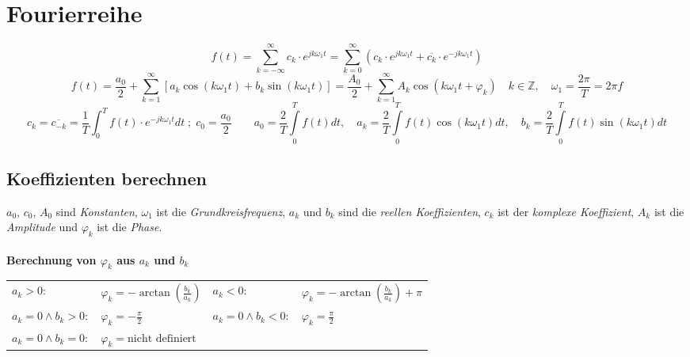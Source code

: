 \section{Fourierreihe}
  	$$\boxed{f(t) = \sum\limits_{k = -\infty}^{\infty} c_k \cdot e^{j k \omega_1
  	t}}= \boxed{\sum\limits_{k = 0}^{\infty} \left(c_k \cdot e^{j k \omega_1
  	t} + \overline{c_k} \cdot e^{-j k \omega_1t}\right)}$$
  	$$\boxed{f(t) = \frac{a_0}{2} + \sum\limits_{k=1}^{\infty} \left[a_k \cos(k
  	\omega_1 t) + b_k \sin(k \omega_1 t)\right]}=\boxed{\frac{A_0}{2} +
  	\sum\limits_{k=1}^{\infty} A_k \cos(k \omega_1 t + \varphi_k)} \quad k\in
  	\mathbb{Z}, \quad \boxed{\omega_1=\frac{2 \pi}{T}=2 \pi f}$$	
	$$\boxed{c_k=\overline{c_{-k}}=\frac{1}{T}\int_0^T{f(t)\cdot
	e^{-jk\omega_1
	t}dt} \; ; \; c_0 = \frac{a_0}{2}} \qquad \boxed{a_0 = \frac{2}{T}\int\limits_0^{T}
	f(t)dt, \quad a_k = \frac{2}{T}\int\limits_0^{T} f(t)\cos(k \omega_1 t) dt, \quad b_k =
	\frac{2}{T}\int\limits_0^{T} f(t)\sin(k \omega_1 t) dt}$$

	\subsection{Koeffizienten berechnen}
		$a_0$, $c_0$, $A_0$ sind \textit{Konstanten}, $\omega_1$ ist die
		\textit{Grundkreisfrequenz}, $a_k$ und $b_k$ sind die \textit{reellen
		Koeffizienten}, $c_k$ ist der \textit{komplexe Koeffizient}, $A_k$ ist die
		\textit{Amplitude} und $\varphi_k$ ist die \textit{Phase}.\\
		\\
	
		\textbf{Berechnung von $\varphi_k$ aus $a_k$ und $b_k$}\\
		\begin{tabular}{p{4cm}p{4cm}p{3cm}p{3.5cm}}
			$a_k> 0:$ & $\varphi_k = -\arctan(\frac{b_k}{a_k})$ &
			$a_k<0:$ &	$\varphi_k = -\arctan(\frac{b_k}{a_k}) + \pi$\\
			$a_k = 0 \wedge b_k > 0:$ &	$\varphi_k = -\frac{\pi}{2}$ &
			$a_k = 0 \wedge b_k < 0:$ &	$\varphi_k = \frac{\pi}{2}$\\
			$a_k = 0 \wedge b_k = 0:$ &	$\varphi_k = \text{nicht definiert}$
		\end{tabular}

